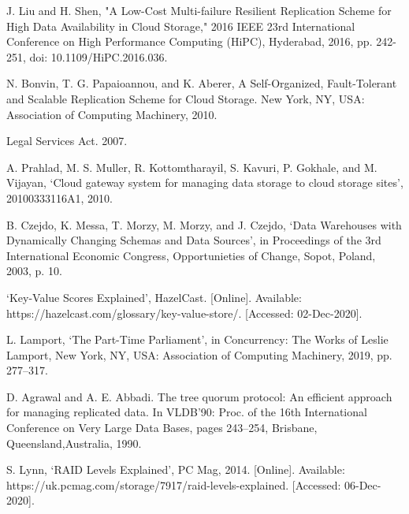 \documentclass{UoYCSproject}
\begin{document}
\begin{thebibliography}{100}
J. Liu and H. Shen, "A Low-Cost Multi-failure Resilient Replication Scheme for High Data Availability in Cloud Storage," 2016 IEEE 23rd International Conference on High Performance Computing (HiPC), Hyderabad, 2016, pp. 242-251, doi: 10.1109/HiPC.2016.036.

N. Bonvin, T. G. Papaioannou, and K. Aberer, A Self-Organized, Fault-Tolerant and Scalable Replication Scheme for Cloud Storage. New York, NY, USA: Association of Computing Machinery, 2010.

Legal Services Act. 2007.

A. Prahlad, M. S. Muller, R. Kottomtharayil, S. Kavuri, P. Gokhale, and M. Vijayan, ‘Cloud gateway system for managing data storage to cloud storage sites’, 20100333116A1, 2010.

B. Czejdo, K. Messa, T. Morzy, M. Morzy, and J. Czejdo, ‘Data Warehouses with Dynamically Changing Schemas and Data Sources’, in Proceedings of the 3rd International Economic Congress, Opportunieties of Change, Sopot, Poland, 2003, p. 10.

‘Key-Value Scores Explained’, HazelCast. [Online]. Available: https://hazelcast.com/glossary/key-value-store/. [Accessed: 02-Dec-2020].

L. Lamport, ‘The Part-Time Parliament’, in Concurrency: The Works of Leslie Lamport, New York, NY, USA: Association of Computing Machinery, 2019, pp. 277–317.

D. Agrawal and A. E. Abbadi. The tree quorum protocol: An efficient approach for managing replicated data. In VLDB’90: Proc. of the 16th International Conference on Very Large Data Bases, pages 243–254, Brisbane, Queensland,Australia, 1990.

S. Lynn, ‘RAID Levels Explained’, PC Mag, 2014. [Online]. Available: https://uk.pcmag.com/storage/7917/raid-levels-explained. [Accessed: 06-Dec-2020].

\end{thebibliography}
\end{document}
